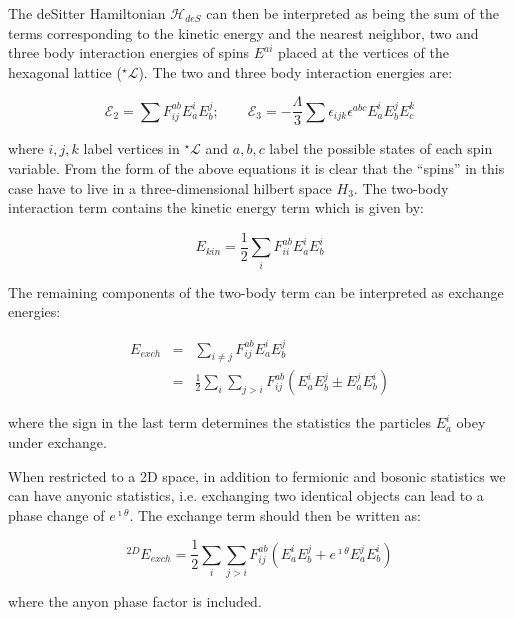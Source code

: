\begin{doublespace}
The deSitter Hamiltonian $\mathcal{H}_{deS}$ can then be interpreted as being the sum of the terms corresponding to the kinetic energy and the nearest neighbor, two and three body interaction energies of spins $E^{ai}$ placed at the vertices of the hexagonal lattice (${}^{\star}\mathcal{L}$). The two and three body interaction energies are:

\begin{equation}\label{eqn:nBodyEnergy}
	\mathcal{E}_{2} = \sum F^{ab}_{ij} E^{i}_{a} E^{j}_{b}; \qquad \mathcal{E}_{3} = -\frac{\Lambda}{3} \sum \epsilon_{ijk} \epsilon^{abc} E^{i}_{a} E^{j}_{b} E^{k}_{c}
\end{equation}

where $i,j,k$ label vertices in $^{\star}\mathcal{L}$ and $a,b,c$ label the possible states of each spin variable. From the form of the above equations it is clear that the ``spins'' in this case have to live in a three-dimensional hilbert space $H_{3}$. The two-body interaction term contains the kinetic energy term which is given by:

\begin{equation}\label{eqn:kinTerm}
	E_{kin} = \frac{1}{2}\sum_{i} F^{ab}_{ii} E^{i}_{a} E^{i}_{b}
\end{equation}

The remaining components of the two-body term can be interpreted as exchange energies:

\begin{eqnarray}\label{eqn:exchTerm}
	E_{exch} & = & \sum_{i \neq j}  F^{ab}_{ij} E^{i}_{a} E^{j}_{b} \\
			    & = & \frac{1}{2} \sum_{i} \sum_{j > i} F^{ab}_{ij} \left( E^{i}_{a} E^{j}_{b} \pm E^{j}_{a} E^{i}_{b} \right )
\end{eqnarray}

where the sign in the last term determines the statistics the particles $E^{i}_{a}$ obey under exchange.

When restricted to a 2D space, in addition to fermionic and bosonic statistics we can have anyonic statistics, i.e. exchanging two identical objects can lead to a phase change of $e^{\imath \theta}$. The exchange term should then be written as:

\begin{equation*}
	^{2D}E_{exch} = \frac{1}{2} \sum_{i} \sum_{j > i} F^{ab}_{ij} \left( E^{i}_{a} E^{j}_{b} + e^{\imath \theta} E^{j}_{a} E^{i}_{b} \right )
\end{equation*}

where the anyon phase factor is included.


\end{doublespace}
